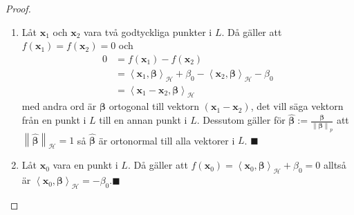 \documentclass[a4paper, 12pt]{report}
\theoremstyle{definition}
\theoremstyle{remark}
\newcommand{\bfbeta}{{\boldsymbol{\beta}}}
\renewcommand\qedsymbol{$\blacksquare$}
\newcommand{\bfx}{\mathbf{x}}
\newcommand{\llangle}{\left\langle}
\newcommand{\rrangle}{\right\rangle}
\newcommand{\inner}[2]{\llangle #1, #2 \rrangle}
\newcommand{\hil}{\mathcal{H}}
\begin{document}
\begin{proof}%
	\leavevmode
\begin{enumerate}
	\item Låt $\mathbf{x}_1$ och $\mathbf{x}_2$ vara två godtyckliga punkter i $L$. Då gäller att $f\left(\mathbf{x}_1\right)=f\left(\mathbf{x}_2\right)=0$ och
	\begin{align*}
		0 &= f\left(\mathbf{x}_1\right)-f\left(\mathbf{x}_2\right)\\
		&= \inner{\bfx_1}{\bfbeta}_\hil + \beta_0 - \inner{\bfx_2}{\bfbeta}_\hil - \beta_0\\
		&= \inner{\mathbf{x}_1-\mathbf{x}_2}{\bfbeta}_\hil
	\end{align*}
	med andra ord är $\bfbeta$ ortogonal till vektorn $\left(\mathbf{x}_1-\mathbf{x}_2\right)$, det vill säga vektorn från en punkt i $L$ till en annan punkt i $L$.
	Dessutom gäller för $\widehat{\bfbeta}:=\frac{\bfbeta}{\left\|\bfbeta
	\right\|_p}$ att $\left\|\widehat{\bfbeta}\right\|_\hil=1$ så $\widehat{\bfbeta}$ är ortonormal till alla vektorer i $L$. \hfill\qedsymbol

	\item \label{eq:egenskap2}Låt $\mathbf{x}_0$ vara en punkt i $L$. Då gäller att $f\left(\mathbf{x}_0\right)=\inner{\bfx_0}{\bfbeta}_\hil + \beta_0 = 0$ alltså är $\inner{\bfx_0}{\bfbeta}_\hil = - \beta_0$.\hfill \qedsymbol
	

\end{enumerate}
\end{proof}
\end{document}
